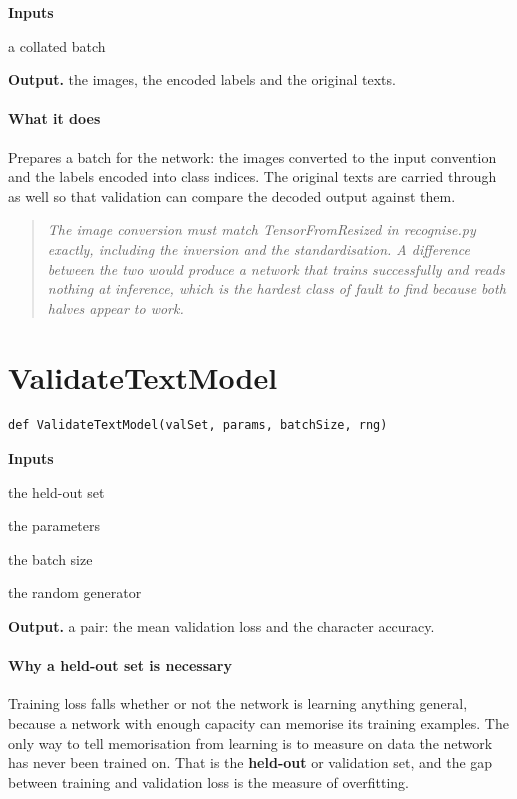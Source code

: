 \noindent\textbf{Inputs}
\begin{description}[leftmargin=2.2em,style=nextline,font=\normalfont\ttfamily]\setlength\itemsep{1pt}
  \item[{batch}] \normalfont a collated batch
\end{description}

\noindent\textbf{Output.} the images, the encoded labels and the original texts.


\paragraph{What it does}
Prepares a batch for the network: the images converted to the input convention and the labels encoded into class indices. The original texts are carried through as well so that validation can compare the decoded output against them.


\begin{quote}\small\itshape The image conversion must match TensorFromResized in recognise.py exactly, including the inversion and the standardisation. A difference between the two would produce a network that trains successfully and reads nothing at inference, which is the hardest class of fault to find because both halves appear to work.\end{quote}

\section{ValidateTextModel}
\begin{lstlisting}[style=sig]
def ValidateTextModel(valSet, params, batchSize, rng)
\end{lstlisting}

\noindent\textbf{Inputs}
\begin{description}[leftmargin=2.2em,style=nextline,font=\normalfont\ttfamily]\setlength\itemsep{1pt}
  \item[{valSet}] \normalfont the held-out set
  \item[{params}] \normalfont the parameters
  \item[{batchSize}] \normalfont the batch size
  \item[{rng}] \normalfont the random generator
\end{description}

\noindent\textbf{Output.} a pair: the mean validation loss and the character accuracy.


\paragraph{Why a held-out set is necessary}
Training loss falls whether or not the network is learning anything general, because a network with enough capacity can memorise its training examples. The only way to tell memorisation from learning is to measure on data the network has never been trained on. That is the \textbf{held-out} or validation set, and the gap between training and validation loss is the measure of overfitting.


